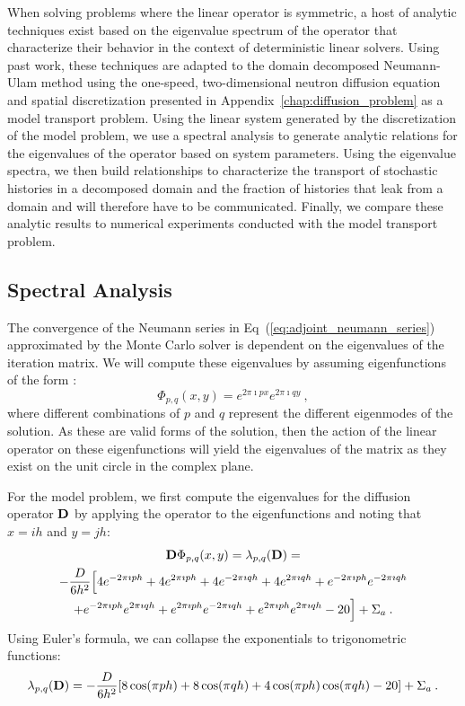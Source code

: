 When solving problems where the linear operator is symmetric, a host
of analytic techniques exist based on the eigenvalue spectrum of the
operator that characterize their behavior in the context of
deterministic linear solvers. Using past work, these techniques are
adapted to the domain decomposed Neumann-Ulam method using the
one-speed, two-dimensional neutron diffusion equation and spatial
discretization presented in Appendix~\ref{chap:diffusion_problem} as a
model transport problem. Using the linear system generated by the
discretization of the model problem, we use a spectral analysis to
generate analytic relations for the eigenvalues of the operator based
on system parameters. Using the eigenvalue spectra, we then build
relationships to characterize the transport of stochastic histories in
a decomposed domain and the fraction of histories that leak from a
domain and will therefore have to be communicated. Finally, we compare
these analytic results to numerical experiments conducted with the
model transport problem.

\clearpage

\subsection{Spectral Analysis }
\label{subsec:spectral_analysis}
The convergence of the Neumann series in
Eq~(\ref{eq:adjoint_neumann_series}) approximated by the Monte Carlo
solver is dependent on the eigenvalues of the iteration matrix. We
will compute these eigenvalues by assuming eigenfunctions of the form
\citep{leveque_finite_2007}:
\begin{equation}
  \Phi_{p,q}(x,y) = e^{2 \pi \imath p x} e^{2 \pi \imath q y}\:,
  \label{eq:eigenfunction_form}
\end{equation}
where different combinations of $p$ and $q$ represent the different
eigenmodes of the solution. As these are valid forms of the solution,
then the action of the linear operator on these eigenfunctions will
yield the eigenvalues of the matrix as they exist on the unit circle
in the complex plane.

For the model problem, we first compute the eigenvalues for the
diffusion operator $\mathbf{D}$ by applying the operator to the
eigenfunctions and noting that $x=ih$ and $y=jh$:
\begin{multline}
  \mathbf{D}\Phi_{p,q}(x,y) = \lambda_{p,q}(\mathbf{D})
  =\\ -\frac{D}{6h^2}\Big[4 e^{-2 \pi \imath p h} + 4 e^{2 \pi \imath
      p h} + 4 e^{-2 \pi \imath q h} + 4 e^{2 \pi \imath q h} + e^{-2
      \pi \imath p h} e^{-2 \pi \imath q h} \\ + e^{-2 \pi \imath p h}
    e^{2 \pi \imath q h} + e^{2 \pi \imath p h} e^{-2 \pi \imath q h}
    + e^{2 \pi \imath p h} e^{2 \pi \imath q h} - 20\Big] + \Sigma_a
  \:.
  \label{eq:deriv_diff_1}
\end{multline}
Using Euler's formula, we can collapse the exponentials to
trigonometric functions:
\begin{equation}
  \lambda_{p,q}(\mathbf{D}) = -\frac{D}{6h^2}[ 8 \cos(\pi p h) + 8
    \cos(\pi q h) + 4 \cos(\pi p h) \cos(\pi q h) - 20] + \Sigma_a\:.
  \label{eq:deriv_diff_2}
\end{equation}

